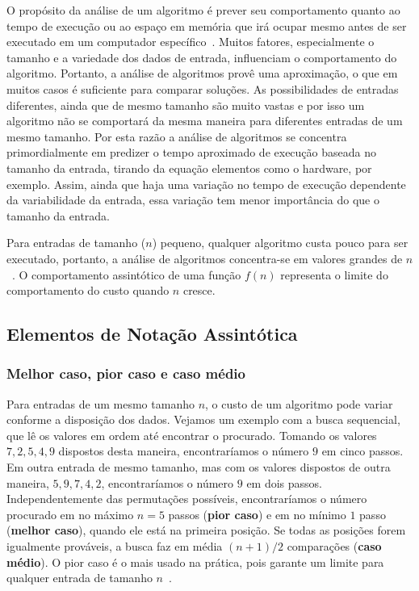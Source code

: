 \documentclass[11pt,fleqn]{book} %
\begin{document}
O propósito da análise de um algoritmo é prever seu comportamento quanto ao tempo de execução ou ao espaço em memória que irá ocupar mesmo antes de ser executado em um computador específico~\cite{manber1989}.
Muitos fatores, especialmente o tamanho e a variedade dos dados de entrada, influenciam o comportamento do algoritmo.
Portanto, a análise de algoritmos provê uma aproximação, o que em muitos casos é suficiente para comparar soluções.
As possibilidades de entradas diferentes, ainda que de mesmo tamanho são muito vastas e por isso um algoritmo não se comportará da mesma maneira para diferentes entradas de um mesmo tamanho. 
Por esta razão a análise de algoritmos se concentra primordialmente em predizer o tempo aproximado de execução baseada no tamanho da entrada, tirando da equação elementos como o hardware, por exemplo.
Assim, ainda que haja uma variação no tempo de execução dependente da variabilidade da entrada, essa variação tem menor importância do que o tamanho da entrada.

Para entradas de tamanho ($n$) pequeno, qualquer algoritmo custa pouco para ser executado, portanto, a análise de algoritmos concentra-se em valores grandes de $n$~\cite{ziviani2007}.
O comportamento assintótico de uma função $f(n)$ representa o limite do comportamento do custo quando $n$ cresce.

\subsection{Elementos de Notação Assintótica}

\subsubsection{Melhor caso, pior caso e caso médio}
Para entradas de um mesmo tamanho $n$, o custo de um algoritmo pode variar conforme a disposição dos dados.
Vejamos um exemplo com a busca sequencial, que lê os valores em ordem até encontrar o procurado.
Tomando os valores $7, 2, 5, 4, 9$ dispostos desta maneira, encontraríamos o número $9$ em cinco passos.
Em outra entrada de mesmo tamanho, mas com os valores dispostos de outra maneira, $5, 9, 7, 4, 2$, encontraríamos o número $9$ em dois passos.
Independentemente das permutações possíveis, encontraríamos o número procurado em no máximo $n = 5$ passos (\textbf{pior caso}) e em no mínimo $1$ passo (\textbf{melhor caso}), quando ele está na primeira posição.
Se todas as posições forem igualmente prováveis, a busca faz em média $(n+1)/2$ comparações (\textbf{caso médio}).
O pior caso é o mais usado na prática, pois garante um limite para qualquer entrada de tamanho $n$~\cite{cormen2009}.
\end{document}
